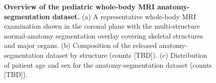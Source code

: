\begin{figure}[t]
\centering
{}
\caption{\textbf{Overview of the pediatric whole-body MRI anatomy-segmentation dataset.}
(a) A representative whole-body MRI examination shown in the coronal plane with the multi-structure normal-anatomy segmentation overlay covering skeletal structures and major organs.
(b) Composition of the released anatomy-segmentation dataset by structure (counts [TBD]).
(c) Distribution of patient age and sex for the anatomy-segmentation dataset (counts [TBD]).}
\label{fig:cohort}
\end{figure}
